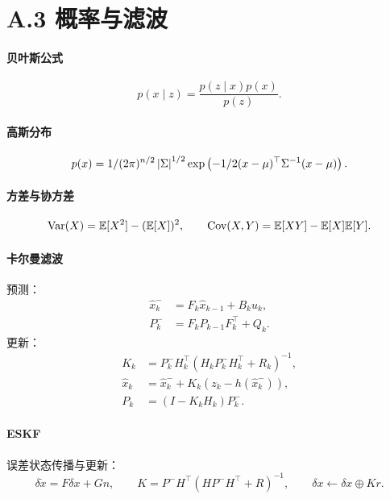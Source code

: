 \section*{A.3 概率与滤波}

\paragraph{贝叶斯公式}
\begin{equation}
p(x\mid z)=\frac{p(z\mid x)p(x)}{p(z)}.
\end{equation}

\paragraph{高斯分布}
\begin{equation}
p(x)=1/(2\pi)^{n/2}\left\lvert \Sigma \right\rvert^{1/2}
\exp\left(-1/2(x-\mu)^{\top}\Sigma^{-1}(x-\mu)\right).
\end{equation}

\paragraph{方差与协方差}
\begin{equation}
\operatorname{Var}(X)=\mathbb{E}[X^{2}]-(\mathbb{E}[X])^{2},\qquad
\operatorname{Cov}(X,Y)=\mathbb{E}[XY]-\mathbb{E}[X]\mathbb{E}[Y].
\end{equation}

\paragraph{卡尔曼滤波}
预测：
\begin{align}
\hat{x}_{k}^{-}&=F_k\hat{x}_{k-1}+B_ku_k,\\
P_k^{-}&=F_kP_{k-1}F_k^{\top}+Q_k.
\end{align}
更新：
\begin{align}
K_k&=P_k^{-}H_k^{\top}\left(H_kP_k^{-}H_k^{\top}+R_k\right)^{-1},\\
\hat{x}_k&=\hat{x}_k^{-}+K_k\left(z_k-h(\hat{x}_k^{-})\right),\\
P_k&=(I-K_kH_k)P_k^{-}.
\end{align}

\paragraph{ESKF}
误差状态传播与更新：
\begin{equation}
\delta\dot{x}=F\delta x+Gn,\qquad
K=P^{-}H^{\top}(HP^{-}H^{\top}+R)^{-1},\qquad
\delta x\leftarrow\delta x\oplus K r.
\end{equation}

